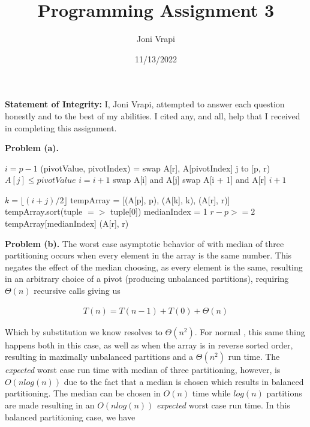 \documentclass{article}
\title{Programming Assignment 3}
\author{Joni Vrapi}
\date{11/13/2022}
\begin{document}
\maketitle

\textbf{Statement of Integrity:} I, Joni Vrapi, attempted to answer each question honestly and to the best of my abilities. I cited any, and all, help that I received in completing this assignment.

\hfill

\textbf{Problem (a).} 

\begin{codebox}
    \li $i = p - 1$
    \li
    \li (pivotValue, pivotIndex) = 
    \li swap A[r], A[pivotIndex]
    \li
    \li \For j to [p, r) \Do
    \li \If $A[j] \leq pivotValue$ \Then
    \li $i = i + 1$
    \li swap A[i] and A[j] \End \End
    \li
    \li swap A[i + 1] and A[r]
    \li
    \li \Return $i + 1$
\end{codebox}

\begin{codebox}
    \li $k = \lfloor (i + j)/2 \rfloor$
    \li
    \li tempArray = [(A[p], p), (A[k], k), (A[r], r)]
    \li tempArray.sort(tuple $=>$ tuple[0])
    \li
    \li medianIndex = 1
    \li
    \li \If $r - p >= 2$ \Then
    \li \Return tempArray[medianIndex]
    \li \Else 
    \li \Return (A[r], r) \End
\end{codebox}

\hfill

\textbf{Problem (b).} The worst case asymptotic behavior of  with median of three partitioning occurs when every element in the array is the same number. This negates the effect of the median choosing, as every element is the same, resulting in an arbitrary choice of a pivot (producing unbalanced partitions), requiring $\Theta(n)$ recursive calls giving us

\begin{gather}
    T(n) = T(n - 1) + T(0) + \Theta(n)
\end{gather}

Which by substitution we know resolves to $\Theta(n^2)$. For normal , this same thing happens both in this case, as well as when the array is in reverse sorted order, resulting in maximally unbalanced partitions and a $\Theta(n^2)$ run time. The \emph{expected} worst case run time with median of three partitioning, however, is $O(nlog(n))$ due to the fact that a median is chosen which results in balanced partitioning. The median can be chosen in $O(n)$ time while $log(n)$ partitions are made resulting in an $O(nlog(n))$ \emph{expected} worst case run time. In this balanced partitioning case, we have
\end{document}
